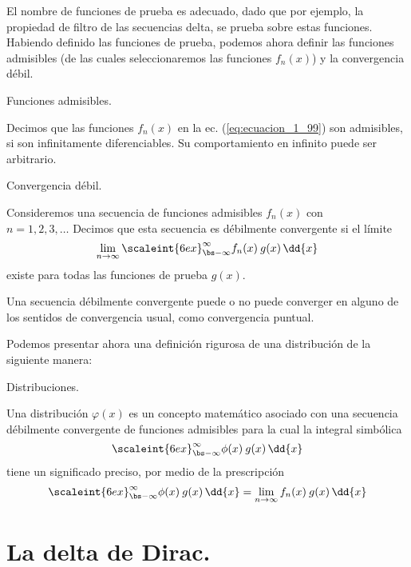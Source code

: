 El nombre de funciones de prueba es adecuado, dado que por ejemplo, la propiedad de filtro de las secuencias delta, se prueba sobre estas funciones. Habiendo definido las funciones de prueba, podemos ahora definir las funciones admisibles (de las cuales seleccionaremos las funciones $f_{n}( x)$) y la convergencia débil.
\begin{defi}
Funciones admisibles.

Decimos que las funciones $f_{n} (x)$ en la ec. (\ref{eq:ecuacion_1_99}) son admisibles, si son infinitamente diferenciables. Su comportamiento en infinito puede ser arbitrario.
\end{defi}
\begin{defi}
Convergencia débil.

Consideremos una secuencia de funciones admisibles $f_{n} (x)$ con \\ $n = 1, 2, 3, \ldots$
Decimos que esta secuencia es débilmente convergente si el límite
\begin{equation}
\lim_{n \to \infty} \scaleint{6ex}_{\bs -\infty}^{\infty} f_{n}(x) \:  g (x) \, \dd{x}
\label{eq:ecuacion_1_100}
\end{equation}
existe para todas las funciones de prueba $g (x)$.
\end{defi}
Una secuencia débilmente convergente puede o no puede converger en alguno de los sentidos de convergencia usual, como convergencia puntual.
\par
Podemos presentar ahora una definición rigurosa de una distribución de la siguiente manera:
\begin{defi}
Distribuciones.

Una distribución $\varphi (x)$ es un concepto matemático asociado con una secuencia débilmente convergente de funciones admisibles para la cual la integral simbólica
\begin{equation}
\scaleint{6ex}_{\bs -\infty}^{\infty} \phi (x) \:  g (x) \, \dd{x}
\label{eq:ecuacion_1_101}
\end{equation}
tiene un significado preciso, por medio de la prescripción
\begin{equation}
\scaleint{6ex}_{\bs -\infty}^{\infty} \phi (x) \: g (x) \, \dd{x} = \lim_{n \to \infty} f_{n} (x) \: g (x) \, \dd{x}
\label{eq:ecuacion_1_102}
\end{equation}
\end{defi}

\section{La delta de Dirac.}

